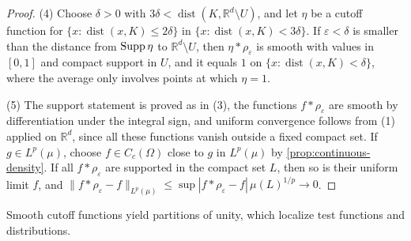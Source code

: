\begin{proof}
(4) Choose $\delta>0$ with $3\delta<\operatorname{dist}(K,\mathbb R^d\setminus U)$, and let $\eta$ be a cutoff function for $\{x:\operatorname{dist}(x,K)\leq2\delta\}$ in $\{x:\operatorname{dist}(x,K)<3\delta\}$. If $\varepsilon<\delta$ is smaller than the distance from $\operatorname{Supp}\eta$ to $\mathbb R^d\setminus U$, then $\eta*\rho_\varepsilon$ is smooth with values in $[0,1]$ and compact support in $U$, and it equals $1$ on $\{x:\operatorname{dist}(x,K)<\delta\}$, where the average only involves points at which $\eta=1$.

(5) The support statement is proved as in (3), the functions $f*\rho_\varepsilon$ are smooth by differentiation under the integral sign, and uniform convergence follows from (1) applied on $\mathbb R^d$, since all these functions vanish outside a fixed compact set. If $g\in L^p(\mu)$, choose $f\in C_c(\Omega)$ close to $g$ in $L^p(\mu)$ by \cref{prop:continuous-density}. If all $f*\rho_\varepsilon$ are supported in the compact set $L$, then so is their uniform limit $f$, and $\|f*\rho_\varepsilon-f\|_{L^p(\mu)}\leq\sup|f*\rho_\varepsilon-f|\,\mu(L)^{1/p}\to0$.
\end{proof}

Smooth cutoff functions yield partitions of unity, which localize test functions and distributions.

